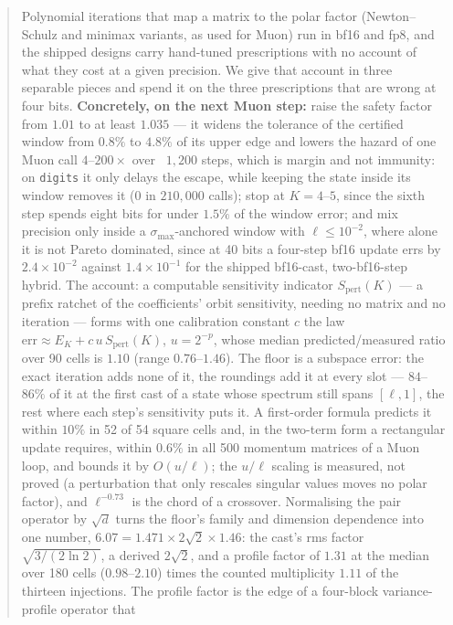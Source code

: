 \begin{abstract}
Polynomial iterations that map a matrix to the polar factor (Newton--Schulz and minimax
variants, as used for Muon) run in bf16 and fp8, and the shipped designs carry
hand-tuned prescriptions with no account of what they cost at a given precision.  We
give that account in three separable pieces and spend it on the
three prescriptions that are wrong at four bits.
\textbf{Concretely, on the next Muon step:} raise the safety factor from $1.01$ to at
least $1.035$ --- it widens the tolerance of the certified window from $0.8\%$ to $4.8\%$
of its upper edge and lowers the hazard of one Muon call $4$--$200\times$ over
\ $1{,}200$ steps, which is margin and not immunity: on \texttt{digits} it only delays the
escape, while keeping the state inside its window removes it ($0$ in $210{,}000$ calls);
stop at $K=4$--$5$, since the sixth step spends eight bits for under $1.5\%$ of the window
error; and mix precision only inside a $\sigma_{\max}$-anchored window with
$\ell\le10^{-2}$, where alone it is not Pareto dominated, since at 40 bits a four-step bf16
update errs by $2.4\times10^{-2}$ against $1.4\times10^{-1}$ for the shipped bf16-cast,
two-bf16-step hybrid.
The account: a computable sensitivity indicator $S_{\mathrm{pert}}(K)$ --- a prefix
ratchet of the coefficients' orbit sensitivity, needing no matrix and no iteration ---
forms with one calibration constant $c$ the law
$\mathrm{err} \approx E_K + c\,u\,S_{\mathrm{pert}}(K)$, $u = 2^{-p}$, whose median
predicted/measured ratio over 90 cells is $1.10$ (range $0.76$--$1.46$).  The floor is a
subspace error: the exact iteration adds none of it, the roundings add it at every slot ---
$84$--$86\%$ of it at the first cast of a state whose spectrum still spans $[\ell,1]$, the
rest where each step's sensitivity puts it.  A first-order formula
predicts it within $10\%$ in 52 of 54 square cells and, in the two-term form a rectangular
update requires, within $0.6\%$ in all 500 momentum matrices of a Muon loop, and bounds it
by $O(u/\ell)$; the $u/\ell$ scaling is measured, not proved (a perturbation that only
rescales singular values moves no polar factor), and $\ell^{-0.73}$ is the chord of a
crossover.
Normalising the pair operator by $\sqrt d$ turns the floor's family and dimension
dependence into one number, $6.07 = 1.471\times2\sqrt2\times1.46$: the cast's rms factor
$\sqrt{3/(2\ln2)}$, a derived $2\sqrt2$, and a profile factor of $1.31$ at the median over
180 cells ($0.98$--$2.10$) times the counted multiplicity $1.11$ of the thirteen
injections.  The profile factor is the edge of a four-block variance-profile operator that

\end{abstract}
